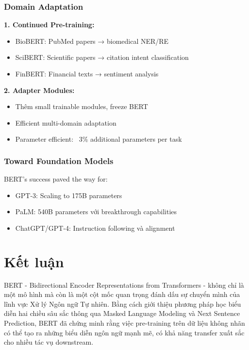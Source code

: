 \subsubsection{Domain Adaptation}

\textbf{1. Continued Pre-training:}
\begin{itemize}
    \item BioBERT: PubMed papers → biomedical NER/RE
    \item SciBERT: Scientific papers → citation intent classification
    \item FinBERT: Financial texts → sentiment analysis
\end{itemize}

\textbf{2. Adapter Modules:}
\begin{itemize}
    \item Thêm small trainable modules, freeze BERT
    \item Efficient multi-domain adaptation
    \item Parameter efficient: ~3\% additional parameters per task
\end{itemize}

\subsubsection{Toward Foundation Models}
BERT's success paved the way for:
\begin{itemize}
    \item GPT-3: Scaling to 175B parameters
    \item PaLM: 540B parameters với breakthrough capabilities
    \item ChatGPT/GPT-4: Instruction following và alignment
\end{itemize}

\section{Kết luận}
\label{sec:ket_luan}
BERT - Bidirectional Encoder Representations from Transformers - không chỉ là một mô hình mà còn là một cột mốc quan trọng đánh dấu sự chuyển mình của lĩnh vực Xử lý Ngôn ngữ Tự nhiên. Bằng cách giới thiệu phương pháp học biểu diễn hai chiều sâu sắc thông qua Masked Language Modeling và Next Sentence Prediction, BERT đã chứng minh rằng việc pre-training trên dữ liệu không nhãn có thể tạo ra những biểu diễn ngôn ngữ mạnh mẽ, có khả năng transfer xuất sắc cho nhiều tác vụ downstream.

